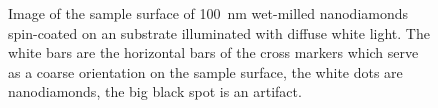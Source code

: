 	\begin{figure}[tp]
		\centering
		\caption{Image of the sample surface of \SI{100}{nm} wet-milled nanodiamonds spin-coated on an \ir substrate illuminated with diffuse white light. The white bars are the horizontal bars of the cross markers which serve as a coarse orientation on the sample surface, the white dots are nanodiamonds, the big black spot is an artifact.}
		\label{fig::ccd_cross_marker}
	\end{figure}


